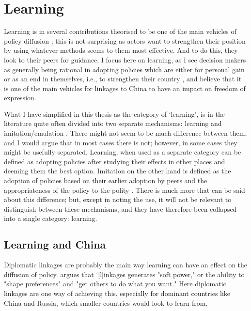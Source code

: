 \section{Learning}
Learning is in several contributions theorised to be one of the main vehicles of policy diffusion \citep{gilardi_four_2016, shipan_mechanisms_2008, simmons_introduction_2006}; this is not surprising as actors want to strengthen their position by using whatever methods seems to them most effective. And to do this, they look to their peers for guidance. I focus here on learning, as I see decision makers as generally being rational in adopting policies which are either for personal gain or as an end in themselves, i.e., to strengthen their country \citep{shipan_mechanisms_2008}, and believe that it is one of the main vehicles for linkages to China to have an impact on freedom of expression.

What I have simplified in this thesis as the category of `learning', is in the literature quite often divided into two separate mechanisms: learning and imitation/emulation \citep{ elkins_waves_2005, gilardi_four_2016, shipan_mechanisms_2008}. There might not seem to be much difference between them, and I would argue that in most cases there is not; however, in some cases they might be usefully separated. Learning, when used as a separate category can be defined as adopting policies after studying their effects in other places and deeming them the best option. Imitation on the other hand is defined as the adoption of policies based on their earlier adoption by peers and the appropriateness of the policy to the polity \citep[pp. 799-801]{simmons_introduction_2006}. There is much more that can be said about this difference; but, except in noting the use, it will not be relevant to distinguish between these mechanisms, and they have therefore been collapsed into a single category: learning. 

\subsection{Learning and China}

Diplomatic linkages are probably the main way learning can have an effect on the diffusion of policy. \citet[p. 385]{levitsky_linkage_2006} argues that `[l]inkages generates "soft power," or the ability to "shape preferences" and "get others to do what you want." Here diplomatic linkages are one way of achieving this, especially for dominant countries like China and Russia, which smaller countries would look to learn from.

